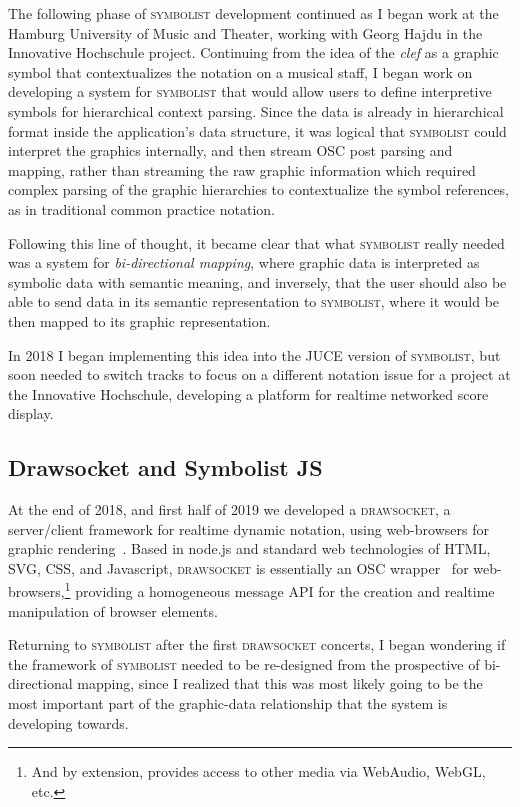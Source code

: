 \documentclass{article}
\def\symbolist{\textsc{symbolist}\xspace}
\def\drawsocket{\textsc{drawsocket}\xspace}
\begin{document}
The following phase of \symbolist development continued as I began work at the Hamburg University of Music and Theater, working with Georg Hajdu in the Innovative Hochschule project. 
Continuing from the idea of the \textit{clef} as a graphic symbol that contextualizes the notation on a musical staff, I began work on developing a system for \symbolist that would allow users to define interpretive symbols for hierarchical context parsing.
Since the data is already in hierarchical format inside the application's data structure, it was logical that \symbolist could interpret the graphics internally, and then stream OSC post parsing and mapping, rather than streaming the raw graphic information which required complex parsing of the graphic hierarchies to contextualize the symbol references, as in traditional common practice notation.

Following this line of thought, it became clear that what \symbolist really needed was a system for \textit{bi-directional mapping}, where graphic data is interpreted as symbolic data with semantic meaning, and inversely, that the user should also be able to send data in its semantic representation to \symbolist, where it would be then mapped to its graphic representation.

In 2018 I began implementing this idea into the JUCE version of \symbolist, but soon needed to switch tracks to focus on a different notation issue for a project at the Innovative Hochschule, developing a platform for realtime networked score display.

\subsection*{Drawsocket and Symbolist JS}\label{sec:drawsocket}

At the end of 2018, and first half of 2019 we developed a \drawsocket, a server/client framework for realtime dynamic notation, using web-browsers for graphic rendering~\cite{gottfried2019drawsocket, hajdu2005quintet}. 
Based in node.js and standard web technologies of HTML, SVG, CSS, and Javascript, \drawsocket is essentially an OSC wrapper~\cite{freed2014io} for web-browsers,\footnote{And by extension, provides access to other media via WebAudio, WebGL, etc.} providing a homogeneous message API for the creation and realtime manipulation of browser elements.

Returning to \symbolist after the first \drawsocket concerts, I began wondering if the framework of \symbolist needed to be re-designed from the prospective of bi-directional mapping, since I realized that this was most likely going to be the most important part of the graphic-data relationship that the system is developing towards. 
\end{document}
